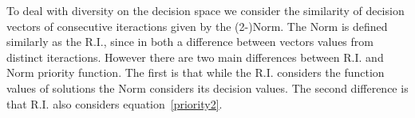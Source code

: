 To deal with diversity on the decision space we consider the similarity of decision vectors of consecutive iteractions given by the (2-)Norm. The Norm is defined similarly as the R.I., since in both a difference between vectors values from distinct iteractions. However there are two main differences between R.I. and Norm priority function. The first is that while the R.I. considers the function values of solutions the Norm considers its decision values. The second difference is that R.I. also considers equation~\ref{priority2}.